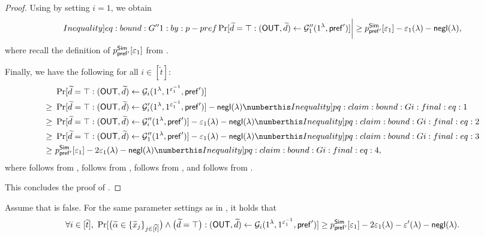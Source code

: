 \begin{proof}
Using  by setting $i = 1$, we obtain 
\begin{equation}\label[Inequality]{eq:bound:G''1:by:p-pref}
\Pr[\tilde{d} = \top : (\OUT,\tilde{d}) \gets \mcal{G}_1''{(1^\secpar,  \msf{pref}')}]\bigg| \ge p^{\msf{Sim}}_{\msf{pref'}}[\epsilon_1] - \epsilon_1(\secpar)  - \negl(\secpar),
\end{equation}
where recall the definition of $p^{\mathsf{Sim}}_{\mathsf{pref'}}[\varepsilon_1]$ from .

Finally, we have the following for all $i \in [\tilde{t}]$:
\begin{align*}
& \Pr[\tilde{d} = \top : (\OUT, \tilde{d}) \gets \mcal{G}_i{(1^\secpar, 1^{\epsilon_1^{-1}},  \msf{pref}')}] \\ 
\ge~ & 
\Pr[\tilde{d} = \top : (\OUT, \tilde{d}) \gets \mcal{G}'_i{(1^\secpar, 1^{\epsilon_1^{-1}},  \msf{pref}')}] -\negl(\secpar) \numberthis \label[Inequality]{pq:claim:bound:Gi:final:eq:1} \\
\ge~ & 
\Pr[\tilde{d} = \top : (\OUT, \tilde{d}) \gets \mcal{G}''_i{(1^\secpar, \msf{pref}')}] - \epsilon_1(\secpar) - \negl(\secpar) \numberthis \label[Inequality]{pq:claim:bound:Gi:final:eq:2} \\
\ge~ & 
\Pr[\tilde{d} = \top : (\OUT, \tilde{d}) \gets \mcal{G}''_1{(1^\secpar,   \msf{pref}')}] - \epsilon_1(\secpar) - \negl(\secpar) \numberthis \label[Inequality]{pq:claim:bound:Gi:final:eq:3} \\
\ge~ & 
p^{\msf{Sim}}_{\msf{pref'}}[\epsilon_1] - 2\epsilon_1(\secpar) - \negl(\secpar) \numberthis \label[Inequality]{pq:claim:bound:Gi:final:eq:4}
,\end{align*}
where  follows from ,  follows from ,  follows from , and  follows from .




    This concludes the proof of . 

\end{proof}



\begin{MyClaim}\label{pq:claim:Gi:lb:comval}
Assume that  is false. For the same parameter settings as in , it holds that
$$\forall i \in  [\widetilde{t}],~\Pr[\big(\widetilde{\alpha} \in \{\widetilde{x}_j\}_{j \in [\widetilde{t}]}\big) \wedge \big(\widetilde{d} = \top \big):(\mathsf{OUT},\widetilde{d}) \gets \mathcal{G}_i{(1^\lambda, 1^{\varepsilon_1^{-1}},  \mathsf{pref}')}] \geq p^{\mathsf{Sim}}_{\mathsf{pref'}}[\varepsilon_1] - 2\varepsilon_1(\lambda) - \varepsilon'(\lambda) - \mathsf{negl}(\lambda).$$
\end{MyClaim}


